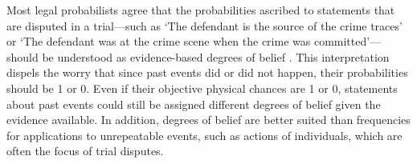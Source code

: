 \documentclass{article}
\begin{document}
Most legal probabilists agree 
that the probabilities ascribed to statements that are disputed in a trial---such as `The defendant is the source of the crime traces' or `The defendant was at the crime scene when the crime was committed'---should be understood as evidence-based degrees of belief \citep[see, for example,][]{Cullison1969Probability, kaye79, nance2016}. 
%
%
This interpretation dispels the worry that since past events  did or did not happen, their probabilities should be 1 or 0. Even if their objective physical chances are 1 or 0, %
statements about past events could still be assigned  different degrees of belief  given the evidence available. %
In addition, degrees of belief are better suited than frequencies for applications to unrepeatable events, such as actions of individuals, which are often the focus of trial disputes.  
\end{document}
